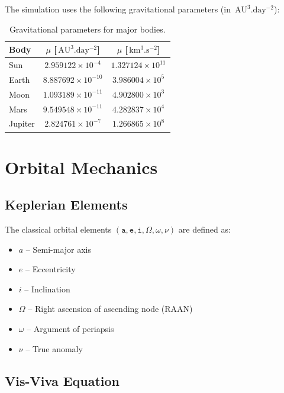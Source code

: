 \documentclass[11pt,a4paper]{article}
\newcommand{\si}[1]{\,\mathrm{#1}}
\begin{document}
The simulation uses the following gravitational parameters (in $\si{AU^3.day^{-2}}$):

\begin{table}[h]
\centering
\begin{tabular}{lcc}
\toprule
\textbf{Body} & $\mu$ [$\si{AU^3.day^{-2}}$] & $\mu$ [$\si{km^3.s^{-2}}$] \\
\midrule
Sun & $2.959122 \times 10^{-4}$ & $1.327124 \times 10^{11}$ \\
Earth & $8.887692 \times 10^{-10}$ & $3.986004 \times 10^{5}$ \\
Moon & $1.093189 \times 10^{-11}$ & $4.902800 \times 10^{3}$ \\
Mars & $9.549548 \times 10^{-11}$ & $4.282837 \times 10^{4}$ \\
Jupiter & $2.824761 \times 10^{-7}$ & $1.266865 \times 10^{8}$ \\
\bottomrule
\end{tabular}
\caption{Gravitational parameters for major bodies.}
\label{tab:mu}
\end{table}

\section{Orbital Mechanics}

\subsection{Keplerian Elements}

The classical orbital elements $(\texttt{a}, \texttt{e}, \texttt{i}, \Omega, \omega, \nu)$ are defined as:

\begin{itemize}
    \item $a$ -- Semi-major axis
    \item $e$ -- Eccentricity
    \item $i$ -- Inclination
    \item $\Omega$ -- Right ascension of ascending node (RAAN)
    \item $\omega$ -- Argument of periapsis
    \item $\nu$ -- True anomaly
\end{itemize}

\subsection{Vis-Viva Equation}
\end{document}
